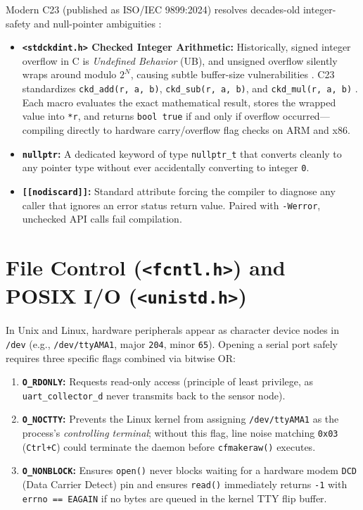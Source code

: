\documentclass[11pt,a4paper,oneside]{report}
\begin{document}
Modern C23 (published as ISO/IEC 9899:2024) resolves decades-old integer-safety and null-pointer ambiguities \cite{gustedt2025,cppref_c23}:
\begin{itemize}
\item \textbf{\texttt{<stdckdint.h>} Checked Integer Arithmetic:} Historically, signed integer overflow in C is \emph{Undefined Behavior} (UB), and unsigned overflow silently wraps around modulo $2^N$, causing subtle buffer-size vulnerabilities \cite{seacord2020}. C23 standardizes \texttt{ckd\_add(r, a, b)}, \texttt{ckd\_sub(r, a, b)}, and \texttt{ckd\_mul(r, a, b)} \cite{cppref_numeric}. Each macro evaluates the exact mathematical result, stores the wrapped value into \texttt{*r}, and returns \texttt{bool true} if and only if overflow occurred---compiling directly to hardware carry/overflow flag checks on ARM and x86.
\item \textbf{\texttt{nullptr}:} A dedicated keyword of type \texttt{nullptr\_t} that converts cleanly to any pointer type without ever accidentally converting to integer \texttt{0}.
\item \textbf{\texttt{[[nodiscard]]}:} Standard attribute forcing the compiler to diagnose any caller that ignores an error status return value. Paired with \texttt{-Werror}, unchecked API calls fail compilation.
\end{itemize}

\section{File Control (\texttt{<fcntl.h>}) and POSIX I/O (\texttt{<unistd.h>})}

In Unix and Linux, hardware peripherals appear as character device nodes in \texttt{/dev} (e.g., \texttt{/dev/ttyAMA1}, major \texttt{204}, minor \texttt{65}). Opening a serial port safely requires three specific flags combined via bitwise OR:
\begin{enumerate}
\item \textbf{\texttt{O\_RDONLY}:} Requests read-only access (principle of least privilege, as \texttt{uart\_collector\_d} never transmits back to the sensor node).
\item \textbf{\texttt{O\_NOCTTY}:} Prevents the Linux kernel from assigning \texttt{/dev/ttyAMA1} as the process's \emph{controlling terminal}; without this flag, line noise matching \texttt{0x03} (\texttt{Ctrl+C}) could terminate the daemon before \texttt{cfmakeraw()} executes.
\item \textbf{\texttt{O\_NONBLOCK}:} Ensures \texttt{open()} never blocks waiting for a hardware modem \texttt{DCD} (Data Carrier Detect) pin and ensures \texttt{read()} immediately returns \texttt{-1} with \texttt{errno == EAGAIN} if no bytes are queued in the kernel TTY flip buffer.
\end{enumerate}
\end{document}
